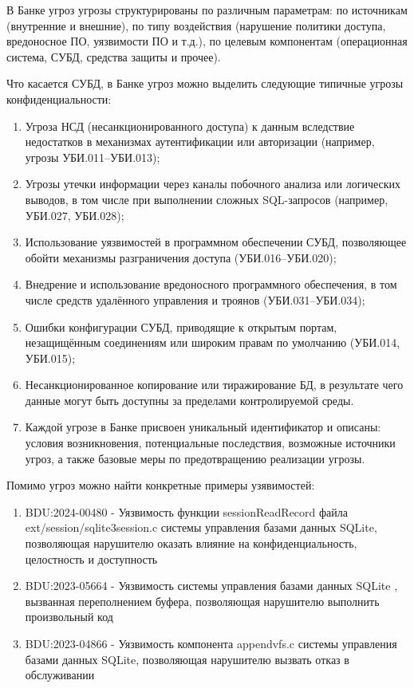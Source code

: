 В Банке угроз угрозы структурированы по различным параметрам: по источникам (внутренние и внешние), по типу воздействия (нарушение политики доступа, вредоносное ПО, уязвимости ПО и т.д.), по целевым компонентам (операционная система, СУБД, средства защиты и прочее).

Что касается СУБД, в Банке угроз можно выделить следующие типичные угрозы конфиденциальности:

\begin{enumerate}

    \item Угроза НСД (несанкционированного доступа) к данным вследствие недостатков в механизмах аутентификации или авторизации (например, угрозы УБИ.011–УБИ.013);
    \item Угрозы утечки информации через каналы побочного анализа или логических выводов, в том числе при выполнении сложных SQL-запросов (например, УБИ.027, УБИ.028);
    \item Использование уязвимостей в программном обеспечении СУБД, позволяющее обойти механизмы разграничения доступа (УБИ.016–УБИ.020);
    \item Внедрение и использование вредоносного программного обеспечения, в том числе средств удалённого управления и троянов (УБИ.031–УБИ.034);
    \item Ошибки конфигурации СУБД, приводящие к открытым портам, незащищённым соединениям или широким правам по умолчанию (УБИ.014, УБИ.015);
    \item Несанкционированное копирование или тиражирование БД, в результате чего данные могут быть доступны за пределами контролируемой среды.
    \item Каждой угрозе в Банке присвоен уникальный идентификатор и описаны: условия возникновения, потенциальные последствия, возможные источники угроз, а также базовые меры по предотвращению реализации угрозы.

\end{enumerate}

Помимо угроз можно найти конкретные примеры узявимостей:

\begin{enumerate}
    \item BDU:2024-00480 - Уязвимость функции sessionReadRecord файла ext/session/sqlite3session.c системы управления базами данных SQLite, позволяющая нарушителю оказать влияние на конфиденциальность, целостность и доступность
    \item BDU:2023-05664 - Уязвимость системы управления базами данных SQLite , вызванная переполнением буфера, позволяющая нарушителю выполнить произвольный код
    \item BDU:2023-04866 - Уязвимость компонента appendvfs.c системы управления базами данных SQLite, позволяющая нарушителю вызвать отказ в обслуживании
\end{enumerate}

